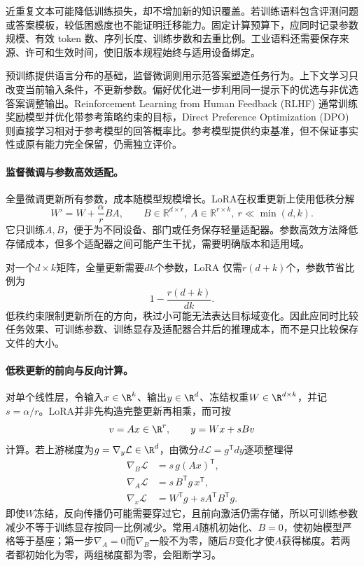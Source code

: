 近重复文本可能降低训练损失，却不增加新的知识覆盖。若训练语料包含评测问题或答案模板，较低困惑度也不能证明迁移能力。固定计算预算下，应同时记录参数规模、有效 token 数、序列长度、训练步数和去重比例。工业语料还需要保存来源、许可和生效时间，使旧版本规程始终与适用设备绑定。

预训练提供语言分布的基础，监督微调则用示范答案塑造任务行为。上下文学习只改变当前输入条件，不更新参数。偏好优化进一步利用同一提示下的优选与非优选答案调整输出。Reinforcement Learning from Human Feedback (RLHF) 通常训练奖励模型并优化带参考策略约束的目标，Direct Preference Optimization (DPO) 则直接学习相对于参考模型的回答概率比。参考模型提供约束基准，但不保证事实性或原有能力完全保留，仍需独立评价。

\paragraph{监督微调与参数高效适配。}
全量微调更新所有参数，成本随模型规模增长。LoRA在权重更新上使用低秩分解
\begin{equation}
 W'=W+\frac{\alpha}{r}BA,\qquad B\in\mathbb{R}^{d\times r},\ A\in\mathbb{R}^{r\times k},\ r\ll\min(d,k).
\end{equation}
它只训练$A,B$，便于为不同设备、部门或任务保存轻量适配器。参数高效方法降低存储成本，但多个适配器之间可能产生干扰，需要明确版本和适用域。

对一个$d\times k$矩阵，全量更新需要$dk$个参数，LoRA 仅需$r(d+k)$个，参数节省比例为
\begin{equation}
 1-\frac{r(d+k)}{dk}.
\end{equation}
低秩约束限制更新所在的方向，秩过小可能无法表达目标域变化。因此应同时比较任务效果、可训练参数、训练显存及适配器合并后的推理成本，而不是只比较保存文件的大小。

\paragraph{低秩更新的前向与反向计算。}
对单个线性层，令输入$x\in\R^k$、输出$y\in\R^d$、冻结权重$W\in\R^{d\times k}$，并记$s=\alpha/r$。LoRA并非先构造完整更新再相乘，而可按
\begin{equation}
 v=Ax\in\R^r,\qquad y=Wx+sBv
\end{equation}
计算。若上游梯度为$g=\nabla_y\mathcal L\in\R^d$，由微分$d\mathcal L=g^{\mathsf T}dy$逐项整理得
\begin{align}
 \nabla_B\mathcal L&=s\,g(Ax)^{\mathsf T},\\
 \nabla_A\mathcal L&=s\,B^{\mathsf T}g\,x^{\mathsf T},\\
 \nabla_x\mathcal L&=W^{\mathsf T}g+sA^{\mathsf T}B^{\mathsf T}g.
\end{align}
即使$W$冻结，反向传播仍可能需要穿过它，且前向激活仍需存储，所以可训练参数减少不等于训练显存按同一比例减少。常用$A$随机初始化、$B=0$，使初始模型严格等于基座；第一步$\nabla_A=0$而$\nabla_B$一般不为零，随后$B$变化才使$A$获得梯度。若两者都初始化为零，两组梯度都为零，会阻断学习。

